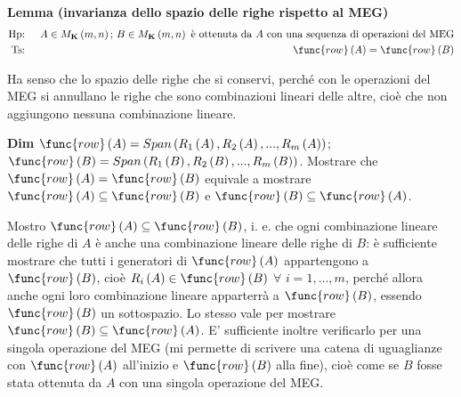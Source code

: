 \documentclass{article}
\begin{document}
\textbf{Lemma (invarianza dello spazio delle righe rispetto al MEG) }%
\begin{eqnarray*}
\text{Hp}\text{: } &&A\in M_{\mathbf{K}}\left( m,n\right) \text{; }B\in M_{%
\mathbf{K}}\left( m,n\right) \text{ \`{e} ottenuta da }A\text{ con una
sequenza di operazioni del MEG} \\
\text{Ts}\text{: } &&\func{row}\left( A\right) =\func{row}\left( B\right) 
\end{eqnarray*}

Ha senso che lo spazio delle righe che si conservi, perch\'{e} con le
operazioni del MEG si annullano le righe che sono combinazioni lineari delle
altre, cio\`{e} che non aggiungono nessuna combinazione lineare.

\textbf{Dim} $\func{row}\left( A\right) =Span\left( R_{1}\left( A\right)
,R_{2}\left( A\right) ,...,R_{m}\left( A\right) \right) $; $\func{row}\left(
B\right) =Span\left( R_{1}\left( B\right) ,R_{2}\left( B\right)
,...,R_{m}\left( B\right) \right) $. Mostrare che $\func{row}\left( A\right)
=\func{row}\left( B\right) $ equivale a mostrare $\func{row}\left( A\right)
\subseteq \func{row}\left( B\right) $ e $\func{row}\left( B\right) \subseteq 
\func{row}\left( A\right) $.

Mostro $\func{row}\left( A\right) \subseteq \func{row}\left( B\right) $, i.
e. che ogni combinazione lineare delle righe di $A$ \`{e} anche una
combinazione lineare delle righe di $B$: \`{e} sufficiente mostrare che
tutti i generatori di $\func{row}\left( A\right) $ appartengono a $\func{row}%
\left( B\right) $, cio\`{e} $R_{i}\left( A\right) \in \func{row}\left(
B\right) $ $\forall $ $i=1,...,m$, perch\'{e} allora anche ogni loro
combinazione lineare apparterr\`{a} a $\func{row}\left( B\right) $, essendo $%
\func{row}\left( B\right) $ un sottospazio. Lo stesso vale per mostrare $%
\func{row}\left( B\right) \subseteq \func{row}\left( A\right) $. E'
sufficiente inoltre verificarlo per una singola operazione del MEG (mi
permette di scrivere una catena di uguaglianze con $\func{row}\left(
A\right) $ all'inizio e $\func{row}\left( B\right) $ alla fine), cio\`{e}
come se $B$ fosse stata ottenuta da $A$ con una singola operazione del MEG.
\end{document}
